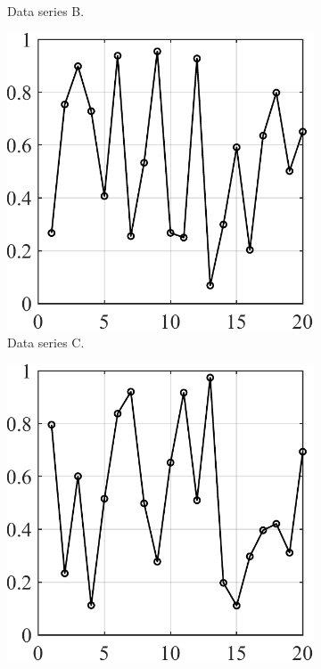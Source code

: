 \documentclass[a4paper]{article}
\begin{document}
\begin{figure}[h!]
\begin{subfigure}[b]{\CE\textwidth}
    \caption{Data series B.}
    \label{fig-b}
\end{subfigure}
\hfill
\begin{subfigure}[b]{\CE\textwidth}
    \includegraphics[width=\textwidth]{pic-3.pdf}
    \caption{Data series C.}
    \label{fig-c}
\end{subfigure}
\hfill
\begin{subfigure}[b]{\CE\textwidth}
    \includegraphics[width=\textwidth]{pic-4.pdf}

\end{subfigure}
\end{figure}
\end{document}
